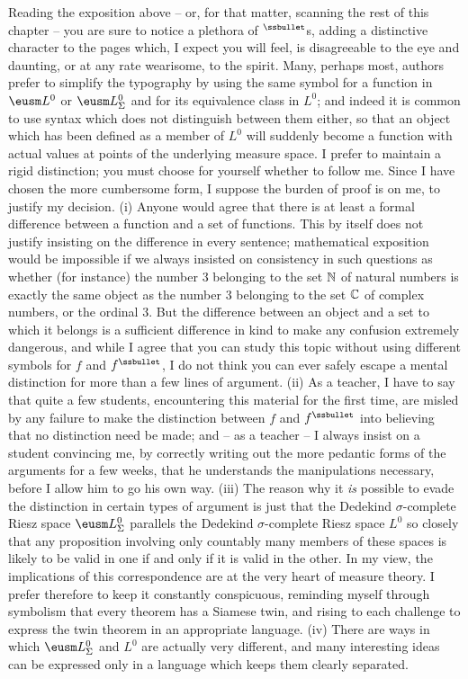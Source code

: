 {Reading the exposition above -- or, for that matter, scanning the rest
of this chapter -- you are sure to notice a plethora of $^{\ssbullet}$s,
adding a distinctive character to the pages which, I expect you will
feel, is disagreeable to the eye and daunting, or at any rate wearisome,
to the spirit.   Many, perhaps most, authors prefer to simplify the
typography by using the same symbol for a function in $\eusm L^0$ or
$\eusm L^0_{\Sigma}$ and for its equivalence class in $L^0$;
and indeed it is common to use syntax which does not distinguish between
them either, so that an object which has been defined as a
member of $L^0$ will suddenly become a function with actual values at
points of the underlying measure space.   I prefer to maintain a rigid
distinction;   you must choose for yourself whether to follow me.
Since I have chosen the more cumbersome form, I suppose the burden of
proof is on me, to justify my decision.   (i) Anyone would agree that
there is at least a formal difference between a function and a set of
functions.   This by itself does not justify insisting on the difference
in every sentence;  mathematical exposition would be impossible if we
always insisted on consistency in such questions as whether (for
instance) the number $3$ belonging to the set $\Bbb N$ of natural
numbers is exactly the same object as the number $3$ belonging to the
set $\Bbb C$ of complex numbers, or the ordinal $3$.   But the
difference between an object and a set to which it belongs is a
sufficient difference in kind to make any confusion extremely dangerous,
and while I agree that you can study this topic without using different
symbols for $f$ and $f^{\ssbullet}$, I do not think you can ever safely
escape a mental distinction for more than a few lines of argument.
(ii) As a teacher, I have to say that quite a few students, encountering
this material for the first time, are misled by any failure to make the
distinction between $f$ and $f^{\ssbullet}$ into believing that no
distinction need be made;   and -- as a teacher -- I always
insist on a student convincing me, by correctly writing out the more
pedantic forms of the arguments for a few weeks, that he understands the
manipulations necessary, before I allow him to go his own way.
(iii) The reason why it {\it is} possible to evade the distinction in
certain types of argument is just that the Dedekind
$\sigma$-complete Riesz space $\eusm L^0_{\Sigma}$ parallels the
Dedekind $\sigma$-complete Riesz space $L^0$ so closely that any
proposition involving only countably many members of these spaces is
likely to be valid in one if and only if it is valid in the other.   In
my view, the
implications of this correspondence are at the very heart of measure
theory.   I prefer therefore to keep it constantly conspicuous,
reminding myself through symbolism that every theorem has a Siamese
twin, and rising to each challenge to express the twin theorem in an
appropriate language.   (iv) There are ways in which 
$\eusm L^0_{\Sigma}$ and $L^0$ are
actually very different, and many interesting ideas can be expressed
only in a language which keeps them clearly separated.

}
